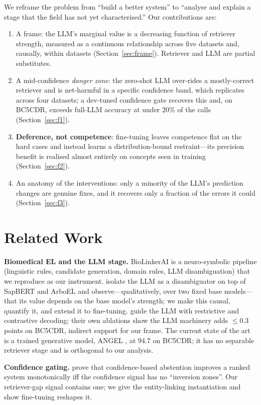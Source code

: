 \documentclass[11pt]{article}
\begin{document}
We reframe the problem from ``build a better system'' to ``analyse and explain a stage
that the field has not yet characterised.'' Our contributions are:
\begin{enumerate}
\item A frame: the LLM's marginal value is a decreasing function of retriever strength,
measured as a continuous relationship across five datasets and, causally, within
datasets (Section~\ref{sec:frame}). Retriever and LLM are partial substitutes.
\item A mid-confidence \emph{danger zone}: the zero-shot LLM over-rides a
mostly-correct retriever and is net-harmful in a specific confidence band, which
replicates across four datasets; a dev-tuned confidence gate recovers this and, on
BC5CDR, exceeds full-LLM accuracy at under $20\%$ of the calls (Section~\ref{sec:f1}).
\item \textbf{Deference, not competence}: fine-tuning leaves competence flat on the hard
cases and instead learns a distribution-bound restraint---its precision benefit is
realised almost entirely on concepts seen in training (Section~\ref{sec:f2}).
\item An anatomy of the interventions: only a minority of the LLM's prediction changes
are genuine fixes, and it recovers only a fraction of the errors it could
(Section~\ref{sec:f3}).
\end{enumerate}

\section{Related Work}
\textbf{Biomedical EL and the LLM stage.} BioLinkerAI \citep{biolinkerai2024} is a
neuro-symbolic pipeline (linguistic rules, candidate generation, domain rules, LLM
disambiguation) that we reproduce as our instrument. \citet{ye2025} isolate the LLM as
a disambiguator on top of SapBERT and ArboEL and observe---qualitatively, over two fixed
base models---that its value depends on the base model's strength; we make this causal,
quantify it, and extend it to fine-tuning. \citet{llm4bioel2025} guide the LLM with
restrictive and contrastive decoding; their own ablations show the LLM machinery adds
$\leq 0.3$ points on BC5CDR, indirect support for our frame. The current state of the
art is a trained generative model, ANGEL \citep{angel2024}, at $94.7$ on BC5CDR; it has
no separable retriever stage and is orthogonal to our analysis.

\textbf{Confidence gating.} \citet{doku2026} prove that confidence-based abstention
improves a ranked system monotonically iff the confidence signal has no ``inversion
zones''. Our retriever-gap signal contains one; we give the entity-linking instantiation
and show fine-tuning reshapes it.
\end{document}

